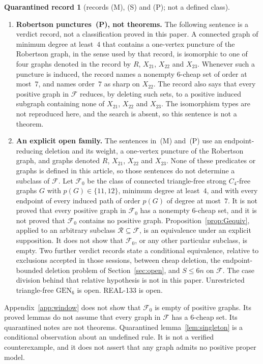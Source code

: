 \documentclass[11pt]{amsart}
\theoremstyle{definition}
\newtheorem*{qbox}{Quarantined record}
\theoremstyle{remark}
\newcommand{\pp}{p}
\newcommand{\GEN}{\mathrm{GEN}}
\begin{document}
\begin{qbox}[records (M), (S) and (P); not a defined class]
\begin{enumerate}
\begin{enumerate}
\end{enumerate}
\item \textbf{Robertson punctures~\textup{(P)}, not theorems.} The following sentence is a verdict record, not a classification proved in this paper. A connected graph of minimum degree at least~$4$ that contains a one-vertex puncture of the Robertson graph, in the sense used by that record, is isomorphic to one of four graphs denoted in the record by $R$, $X_{21}$, $X_{22}$ and $X_{23}$. Whenever such a puncture is induced, the record names a nonempty $6$-cheap set of order at most~$7$, and names order~$7$ as sharp on $X_{22}$. The record also says that every positive graph in $\mathcal F$ reduces, by deleting such sets, to a positive induced subgraph containing none of $X_{21}$, $X_{22}$ and $X_{23}$. The isomorphism types are not reproduced here, and the search is absent, so this sentence is not a theorem.
\item \textbf{An explicit open family.} The sentences in~\textup{(M)} and~\textup{(P)} use an endpoint-reducing deletion and its weight, a one-vertex puncture of the Robertson graph, and graphs denoted $R$, $X_{21}$, $X_{22}$ and $X_{23}$. None of these predicates or graphs is defined in this article, so those sentences do not determine a subclass of $\mathcal F$. Let $\mathcal F_0$ be the class of connected triangle-free strong $C_4$-free graphs $G$ with $\pp(G)\in\{11,12\}$, minimum degree at least~$4$, and with every endpoint of every induced path of order $\pp(G)$ of degree at most~$7$. It is not proved that every positive graph in $\mathcal F_0$ has a nonempty $6$-cheap set, and it is not proved that $\mathcal F_0$ contains no positive graph. Proposition~\ref{prop:Gequiv}, applied to an arbitrary subclass $\mathcal R\subseteq\mathcal F$, is an equivalence under an explicit supposition. It does not show that $\mathcal F_0$, or any other particular subclass, is empty. Two further verdict records state a conditional equivalence, relative to exclusions accepted in those sessions, between cheap deletion, the endpoint-bounded deletion problem of Section~\ref{sec:open}, and $S\le 6n$ on $\mathcal F$. The case division behind that relative hypothesis is not in this paper. Unrestricted triangle-free $\GEN_6$ is open. REAL-133 is open.
\end{enumerate}
\end{qbox}

Appendix~\ref{app:window} does not show that $\mathcal F_0$ is empty of positive graphs. Its proved lemmas do not assume that every graph in $\mathcal F$ has a $6$-cheap set. Its quarantined notes are not theorems. Quarantined lemma~\ref{lem:singleton} is a conditional observation about an undefined rule. It is not a verified counterexample, and it does not assert that any graph admits no positive proper model.
\end{document}
